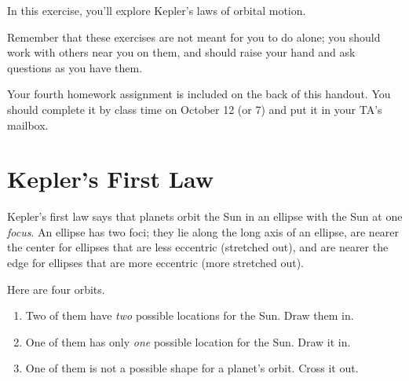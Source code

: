 \documentclass[12pt]{article}
\begin{document}
\Large
\centerline{}

\normalsize

In this exercise, you'll explore Kepler's laws of orbital motion.

Remember that these exercises are not meant for you to do alone; you should work with others near you on them, and should raise your hand and ask questions as you have them.

Your fourth homework assignment is included on the back of this handout. You should complete it by class time on October 12 (or 7) and put it in your TA's mailbox.

\bigskip\bigskip

\section{Kepler's First Law}

Kepler's first law says that planets orbit the Sun in an ellipse with the Sun at one {\it focus}. An ellipse has two foci; they lie along the long axis of an ellipse, are nearer the center for ellipses that are less eccentric (stretched out), and are nearer the edge for ellipses that are more eccentric (more stretched out).

Here are four orbits.

\begin{enumerate}
	\item Two of them have {\it two} possible locations for the Sun. Draw them in.
	\item One of them has only {\it one} possible location for the Sun. Draw it in.
	\item One of them is not a possible shape for a planet's orbit. Cross it out.
\end{enumerate}
\end{document}
